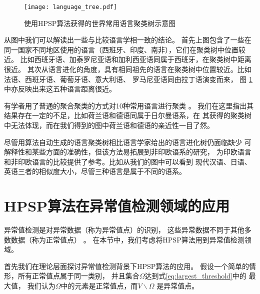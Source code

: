 \begin{figure}[!ht]
    \centering
    \texttt{[image: language\_tree.pdf]}
    \caption{使用HPSP算法获得的世界常用语言聚类树示意图}\label{fig:language_tree}
\end{figure}

从图中我们可以解读出一些与比较语言学相一致的结论。
首先上图包含了一些在同一国家不同地区使用的语言（西班牙、印度、南非），它们在聚类树中位置较近。
比如西班牙语、加泰罗尼亚语和加利西亚语同属于西班牙，在聚类树中距离很近。
其次从语言进化的角度，具有相同祖先的语言在聚类树中位置较近。比如法语、西班牙语、葡萄牙语、意大利语、
罗马尼亚语同由拉丁语演变而来，
图 \ref{fig:language_tree} 中亦反映出来这五种语言距离很近。

有学者用了普通的聚合聚类的方式对10种常用语言进行聚类 \cite{al2017characterization}。
我们在这里指出其结果存在一定的不足，比如荷兰语和德语同属于日尔曼语系，在
其获得的聚类树中无法体现，而在我们得到的图中荷兰语和德语的亲近性一目了然。

尽管用算法自动生成的语言聚类树相比语言学家给出的语言进化树仍面临缺少
可解释性和某些方面的准确性，但该方法易拓展到非印欧语系的研究，
为印欧语言和非印欧语言的比较提供了参考。比如从我们的图中可以看到
现代汉语、日语、英语三者的相似度大小，尽管三种语言是属于不同的语系。



\section{HPSP算法在异常值检测领域的应用}\label{sec:outlier}
异常值检测是对异常数据（称为异常值点）的识别，
这些异常数据不同于其他多数数据（称为正常值点）
\citep{grubbs1969procedures}。
在本节中，我们考虑将HPSP算法用到异常值检测领域。

首先我们在理论层面探讨异常值检测背景下HPSP算法的应用。
假设一个简单的情形，所有正常值点属于同一类别，
并且集合$\Omega$达到式\eqref{eq:largest_threshold}中的
最大值，
我们认为$\Omega$中的元素是正常值点，而$V\backslash \Omega$ 是异常值点。

